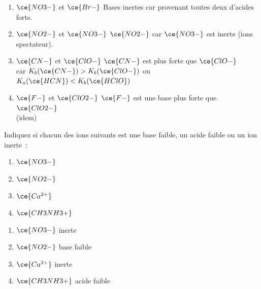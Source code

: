 \documentclass[
  11pt,
  a4paper,
  openany]{book}
\providecommand{\tightlist}{%
  \setlength{\itemsep}{0pt}\setlength{\parskip}{0pt}}
\begin{document}
\begin{Answer}

\begin{enumerate}
\def\labelenumi{\alph{enumi}.}
\tightlist
\item
  \(\ce{NO3-}\) et \(\ce{Br-}\) \tabto{8em} Bases inertes car provenant toutes deux d'acides forts.
  \vspace{1em}
\item
  \(\ce{NO2-}\) et \(\ce{NO3-}\) \tabto{8em} \(\ce{NO2-}\) car \(\ce{NO3-}\) est inerte (ions spectateur).
  \vspace{1em}
\item
  \(\ce{CN-}\) et \(\ce{ClO-}\) \tabto{8em} \(\ce{CN-}\) est plus forte que \(\ce{ClO-}\)\\
  \tabto{8em} car \(K_b(\ce{CN-}) > K_b(\ce{ClO-})\) ou \(K_a(\ce{HCN}) < K_b(\ce{HClO})\)
  \vspace{1em}
\item
  \(\ce{F-}\) et \(\ce{ClO2-}\) \tabto{8em} \(\ce{F-}\) est une base plus forte que \(\ce{ClO2-}\)\\
  \tabto{8em} (idem)
\end{enumerate}

\end{Answer}

\begin{Exercise}

Indiquez si chacun des ions suivants est une base faible, un acide faible ou un ion inerte~:

\begin{enumerate}
\def\labelenumi{\alph{enumi}.}
\tightlist
\item
  \(\ce{NO3-}\)
\item
  \(\ce{NO2-}\)
\item
  \(\ce{Ca^{2+}}\)
\item
  \(\ce{CH3NH3+}\)
\end{enumerate}

\end{Exercise}

\begin{Answer}

\begin{enumerate}
\def\labelenumi{\alph{enumi}.}
\tightlist
\item
  \(\ce{NO3-}\) \tabto{6em} inerte
  \vspace{1em}
\item
  \(\ce{NO2-}\) \tabto{6em} base faible
  \vspace{1em}
\item
  \(\ce{Ca^{2+}}\) \tabto{6em} inerte
  \vspace{1em}
\item
  \(\ce{CH3NH3+}\) \tabto{6em} acide faible
  \vspace{1em}
\end{enumerate}

\end{Answer}
\end{document}
